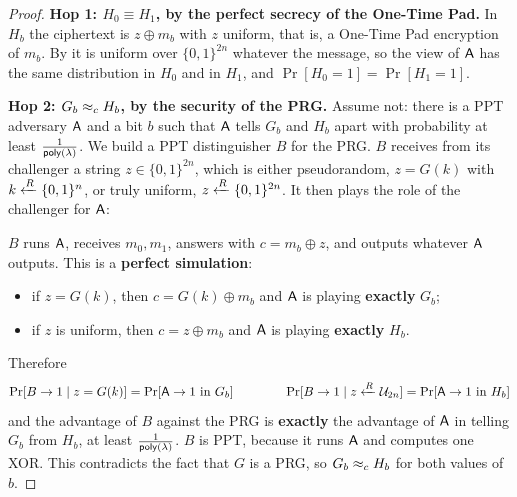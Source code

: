 \begin{proof}
  \leavevmode
  \textbf{Hop 1: $H_0 \equiv H_1$, by the perfect secrecy of the One-Time Pad.} In $H_b$ the ciphertext is $z \oplus m_b$ with $z$ uniform, that is, a One-Time Pad encryption of $m_b$. By  it is uniform over $\{0,1\}^{2n}$ whatever the message, so the view of $\mathsf{A}$ has the same distribution in $H_0$ and in $H_1$, and $\Pr[H_0 = 1] = \Pr[H_1 = 1]$.

  \medskip
  \textbf{Hop 2: $G_b \approx_c H_b$, by the security of the PRG.} Assume not: there is a PPT adversary $\mathsf{A}$ and a bit $b$ such that $\mathsf{A}$ tells $G_b$ and $H_b$ apart with probability at least $\frac{1}{\mathsf{poly}(\lambda)}$. We build a PPT distinguisher $B$ for the PRG. $B$ receives from its challenger a string $z \in \{0,1\}^{2n}$, which is either pseudorandom, $z = G(k)$ with $k \xleftarrow{R} \{0,1\}^n$, or truly uniform, $z \xleftarrow{R} \{0,1\}^{2n}$. It then plays the role of the challenger for $\mathsf{A}$:

  \begin{center}
  \end{center}

  $B$ runs $\mathsf{A}$, receives $m_0, m_1$, answers with $c = m_b \oplus z$, and outputs whatever $\mathsf{A}$ outputs. This is a \textbf{perfect simulation}:
  \begin{itemize}
    \item if $z = G(k)$, then $c = G(k) \oplus m_b$ and $\mathsf{A}$ is playing \textbf{exactly} $G_b$;
    \item if $z$ is uniform, then $c = z \oplus m_b$ and $\mathsf{A}$ is playing \textbf{exactly} $H_b$.
  \end{itemize}
  Therefore
  \[
    \Pr[B \to 1 \mid z = G(k)] = \Pr[\mathsf{A} \to 1 \text{ in } G_b] \qquad\qquad \Pr[B \to 1 \mid z \xleftarrow{R} \mathcal{U}_{2n}] = \Pr[\mathsf{A} \to 1 \text{ in } H_b]
  \]
  and the advantage of $B$ against the PRG is \textbf{exactly} the advantage of $\mathsf{A}$ in telling $G_b$ from $H_b$, at least $\frac{1}{\mathsf{poly}(\lambda)}$. $B$ is PPT, because it runs $\mathsf{A}$ and computes one XOR. This contradicts the fact that $G$ is a PRG, so $G_b \approx_c H_b$ for both values of $b$.


\end{proof}
